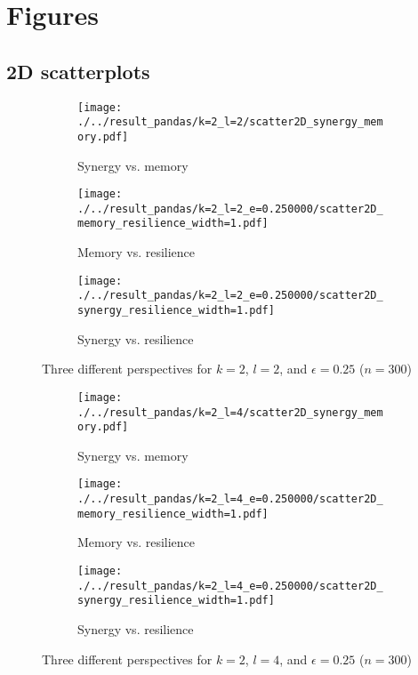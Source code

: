 \documentclass[../main.tex]{subfiles}
\begin{document}
\section{Figures}
\label{appendix_figures}

\subsection{2D scatterplots}

\begin{figure}[H]
    \centering
    \begin{subfigure}[b]{0.3\textwidth}
        \texttt{[image: ./../result\_pandas/k=2\_l=2/scatter2D\_synergy\_memory.pdf]}
        \caption{Synergy vs. memory}
    \end{subfigure}
    \begin{subfigure}[b]{0.3\textwidth}
        \texttt{[image: ./../result\_pandas/k=2\_l=2\_e=0.250000/scatter2D\_memory\_resilience\_width=1.pdf]}
        \caption{Memory vs. resilience}
    \end{subfigure}
    \begin{subfigure}[b]{0.3\textwidth}
        \texttt{[image: ./../result\_pandas/k=2\_l=2\_e=0.250000/scatter2D\_synergy\_resilience\_width=1.pdf]}
        \caption{Synergy vs. resilience}
    \end{subfigure}
    \caption{Three different perspectives for $k=2$, $l=2$, and $\epsilon = 0.25$ ($n=300$)}
    \label{fig:2d22}
\end{figure}

\begin{figure}[H]
    \centering
    \begin{subfigure}[b]{0.3\textwidth}
        \texttt{[image: ./../result\_pandas/k=2\_l=4/scatter2D\_synergy\_memory.pdf]}
        \caption{Synergy vs. memory}
    \end{subfigure}
    \begin{subfigure}[b]{0.3\textwidth}
        \texttt{[image: ./../result\_pandas/k=2\_l=4\_e=0.250000/scatter2D\_memory\_resilience\_width=1.pdf]}
        \caption{Memory vs. resilience}
    \end{subfigure}
    \begin{subfigure}[b]{0.3\textwidth}
        \texttt{[image: ./../result\_pandas/k=2\_l=4\_e=0.250000/scatter2D\_synergy\_resilience\_width=1.pdf]}
        \caption{Synergy vs. resilience}
    \end{subfigure}
    \caption{Three different perspectives for $k=2$, $l=4$, and $\epsilon = 0.25$ ($n=300$)}
    \label{fig:2d24}
\end{figure}
\end{document}
